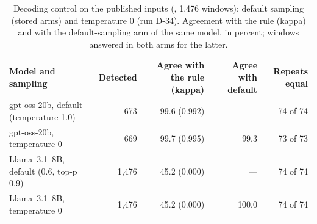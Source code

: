 \begin{table}[!t]
\centering
\caption{Decoding control on the published inputs (, 1{,}476 windows): default sampling (stored arms) and temperature 0 (run D-34). Agreement with the rule (kappa) and with the default-sampling arm of the same model, in percent; windows answered in both arms for the latter.}
\label{tab:decoding}
\footnotesize
\setlength{\tabcolsep}{3pt}
\begin{tabularx}{\textwidth}{@{}Xrrrr@{}}
\toprule
Model and sampling & Detected & Agree with the rule (kappa) & Agree with default & Repeats equal \\
\midrule
gpt-oss-20b, default (temperature 1.0) & 673 & 99.6 (0.992) & --- & 74 of 74 \\
gpt-oss-20b, temperature 0 & 669 & 99.7 (0.995) & 99.3 & 73 of 73 \\
Llama~3.1~8B, default (0.6, top-p 0.9) & 1{,}476 & 45.2 (0.000) & --- & 74 of 74 \\
Llama~3.1~8B, temperature 0 & 1{,}476 & 45.2 (0.000) & 100.0 & 74 of 74 \\
\bottomrule
\end{tabularx}
\end{table}

